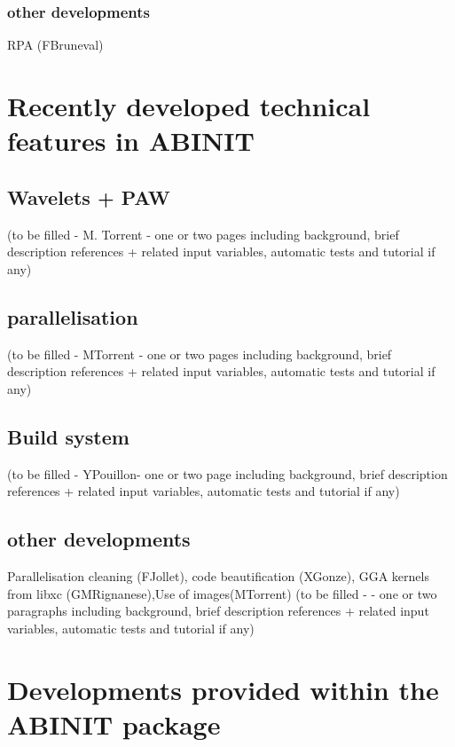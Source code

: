 \documentclass{elsart}
\begin{document}
\subsubsection{other developments}
RPA (FBruneval)

\newpage

\section{Recently developed technical features in ABINIT}

\subsection{Wavelets + PAW }
(to be filled - M. Torrent - one or two pages including background, brief description references + related input variables, automatic tests and tutorial if any)

\subsection{parallelisation }
(to be filled - MTorrent - one or two pages including background, brief description references + related input variables, automatic tests and tutorial if any)

\subsection{Build system }
(to be filled - YPouillon- one or two page including background, brief description references + related input variables, automatic tests and tutorial if any)

\subsection{other developments}
Parallelisation cleaning (FJollet), code beautification (XGonze), GGA kernels from libxc (GMRignanese),Use of images(MTorrent)
(to be filled -  - one or two paragraphs including background, brief description references + related input variables, automatic tests and tutorial if any)


\newpage

\section{Developments provided within the ABINIT package}
\end{document}

